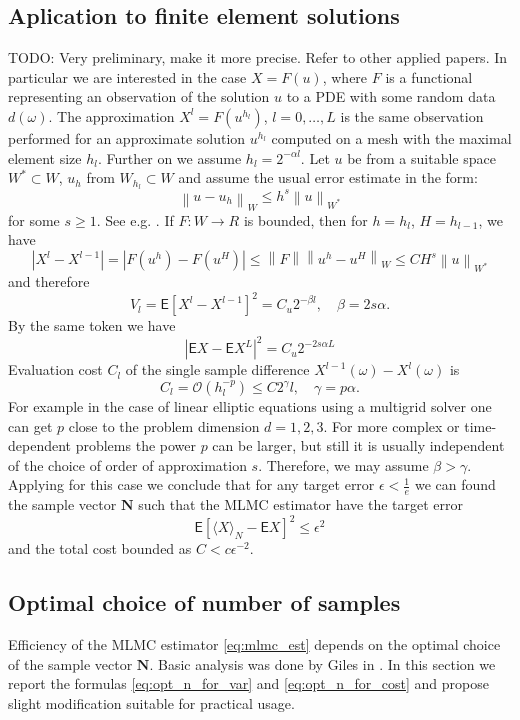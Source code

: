 \documentclass{article}
\def\vc#1{\mathbf{\boldsymbol{#1}}}     %
\def \E{{\mathsf E}}
\newcommand{\norm}[1]{\left\lVert#1\right\rVert}
\def\todo#1{{\color{red}TODO: #1}}
\def\avg#1{\langle#1\rangle}
\def\abs#1{|#1|}
\begin{document}
\subsection{Aplication to finite element solutions}
\todo{Very preliminary, make it more precise. Refer to other applied papers.}
In particular we are interested in the case $X=F(u)$, where $F$ is a functional representing an observation of
the solution $u$ to a PDE with some random data $d(\omega)$. The approximation $X^l = F(u^{h_l})$, $l=0,\dots,L$ is the same observation performed for an approximate solution $u^{h_l}$ computed on a mesh with the maximal element size $h_l$. Further on we assume $h_l = 2^{-\alpha l}$. Let $u$ be from a suitable space 
$W^* \subset W$, $u_h$ from $W_{h_l} \subset W$ and assume the usual error estimate in the form:
\[
	\norm{u - u_h}_{W} \le h^s \norm{u}_{W^*}
\] 
for some $s\ge 1$. See e.g. \cite{Evans1998}.
If $F:W \to R$ is bounded, then for $h=h_l$, $H=h_{l-1}$, we have
\[
	\abs{X^l - X^{l-1}} = \abs{F(u^h) - F(u^H)} \le \norm{F}\norm{u^h - u^H}_W \le C H^s\norm{u}_{W^*}
\]
and therefore 
\begin{equation}
    \label{eq:level_var_pde_est}
    V_l =  \E[X^l - X^{l-1}]^2 = C_u 2^{-\beta l},\quad \beta = 2s\alpha.
\end{equation}
By the same token we have 
\begin{equation}
    \label{eq:aprox_pde_est}
    \abs{\E X - \E X^L}^2 = C_u 2^{-2s\alpha L}
\end{equation}
Evaluation cost $C_l$ of the single sample difference $X^{l-1}(\omega) - X^l(\omega)$ is
\[
  C_l = \mathcal O( h_l^{-p}) \le C 2^\gamma l, \quad \gamma = p\alpha.
\]
For example in the case of linear elliptic equations using a multigrid solver one can get $p$ close to the problem dimension $d=1,2,3$. For more complex or time-dependent problems the power $p$ can be larger, but 
still it is usually independent of the choice of order of approximation $s$. Therefore, we may assume
$\beta > \gamma$. Applying \cite[Theorem 1]{Giles2015} for this case we conclude that for any target error 
$\epsilon< \frac{1}{e}$ we can found the sample vector $\vc N$ such that the MLMC estimator have the target error
\[
  \E[\avg{X}_N - \E X]^2 \le \epsilon^2
\]
and the total cost bounded as $C < c \epsilon^{-2}$. 


\subsection{Optimal choice of number of samples}
Efficiency of the MLMC estimator \eqref{eq:mlmc_est} depends on the optimal choice of the sample vector $\vc N$.
Basic analysis was done by Giles in \cite{Giles2015}. In this section we report the formulas \eqref{eq:opt_n_for_var} and \eqref{eq:opt_n_for_cost} and propose slight modification suitable for practical usage.
\end{document}
